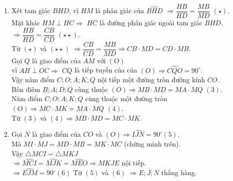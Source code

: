 \begin{bt}
{\begin{enumerate}
	Vậy $\widehat{OHB}=\widehat{DHC}$ mà $\widehat{OHB}+\widehat{BHM}=\widehat{DHC}+\widehat{DHM}=90^\circ $ ($AH\perp OC$).
	$\Rightarrow \widehat{BHM}=\widehat{DHM}\Rightarrow $ $HM$ là đường phân giác của góc $\widehat{BHD}$.
	\item Xét tam giác $BHD$, vì $HM$ là phân giác của $\widehat{BHD}$ $\Rightarrow \dfrac{HB}{HD}=\dfrac{MB}{MD} $ \qquad $(\star)$.\\
	Mặt khác $HM\perp HC\Rightarrow$ $HC$ là đường phân giác ngoài tam giác $BHD$.\\
	$\Rightarrow \dfrac{HB}{HD}=\dfrac{CB}{CD} $ \qquad $(\star\star)$.\\
	Từ $(\star)$ và $(\star\star)$ $\Rightarrow \dfrac{CB}{CD}=\dfrac{MB}{MD}\Rightarrow CB\cdot MD=CD\cdot MB$.\\
	Gọi $Q$ là giao điểm của $AM$ với $(O)$\\
	vì $AH\perp OC\Rightarrow$ $CQ$ là tiếp tuyến của của $(O)\Rightarrow \widehat{CQO}=90^\circ $.\\
	Vậy năm điểm $C;O;A;K;Q$ nội tiếp một đường tròn đường kính $CO$.\\
	Bốn điêm $B;A;D;Q$ cùng thuộc $(O)\Rightarrow MB\cdot MD=MA\cdot MQ$ \qquad $(3)$.\\
	Năm điểm $C;O;A;K;Q$ cùng thuộc một đường tròn $(O)\Rightarrow MC\cdot MK=MA\cdot MQ$ \qquad $(4)$.\\
	Từ $(3)$ và $(4)\Rightarrow MB\cdot  MD=MC\cdot MK.$
	\item Gọi $N$ là giao điểm của $CO$ và $(O)\Rightarrow \widehat{IJN}=90^\circ$\qquad  $(5)$.\\
	Mà $MI\cdot  MJ=MD\cdot MB=MK\cdot MC$ (chứng minh trên).\\
	Vậy $ \triangle MCI\backsim \triangle MKJ$\\
	$\Rightarrow \widehat{MCI}=\widehat{MJK}=\widehat{MEO}\Rightarrow MKJE$ nội tiếp.\\
	$\Rightarrow \widehat{EJM}=90{}^\circ (6)$
	Từ $(5)$ và $(6)$ $\Rightarrow E;J;N$ thẳng hàng.
\end{enumerate}

}
\end{bt}


